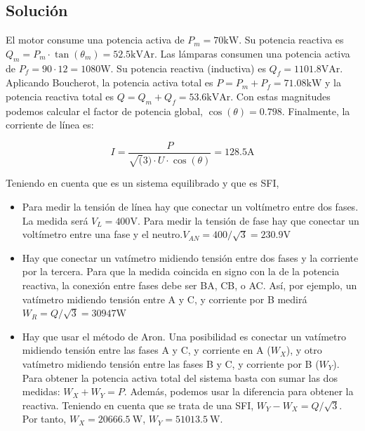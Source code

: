 \subsection*{Solución}

El motor consume una potencia activa de $P_m = 70\mathrm{kW}$. Su
potencia reactiva es
$Q_m = P_m \cdot \tan(\theta_m) = 52.5\mathrm{kVAr}$.  Las lámparas
consumen una potencia activa de $P_f = 90 \cdot 12 =
1080\mathrm{W}$. Su potencia reactiva (inductiva) es
$Q_f = 1101.8\mathrm{VAr}$.  Aplicando Boucherot, la potencia activa
total es $P = P_m + P_f = 71.08\mathrm{kW}$ y la potencia reactiva
total es $Q = Q_m + Q_f = 53.6\mathrm{kVAr}$. Con estas magnitudes
podemos calcular el factor de potencia global, $\cos(\theta) =
0.798$. Finalmente, la corriente de línea es:

\[
  I = \frac{P}{\sqrt(3) \cdot U \cdot \cos(\theta)} = 128.5\mathrm{A}
\]


Teniendo en cuenta que es un sistema equilibrado y que es SFI,

\begin{itemize}

\item Para medir la tensión de línea hay que conectar un voltímetro
  entre dos fases. La medida será $V_{L} = 400\mathrm{V}$. Para medir
  la tensión de fase hay que conectar un voltímetro entre una fase y
  el neutro.$V_{AN} = 400 / \sqrt{3} = 230.9\mathrm{V}$

\item Hay que conectar un vatímetro midiendo tensión entre dos fases y
  la corriente por la tercera. Para que la medida coincida en signo
  con la de la potencia reactiva, la conexión entre fases debe ser BA,
  CB, o AC. Así, por ejemplo, un vatímetro midiendo tensión entre A y
  C, y corriente por B medirá $W_R = Q / \sqrt{3} = 30947\mathrm{W}$

\item Hay que usar el método de Aron. Una posibilidad es conectar un
  vatímetro midiendo tensión entre las fases A y C, y corriente en A
  ($W_X$), y otro vatímetro midiendo tensión entre las fases B y C, y
  corriente por B ($W_Y$). Para obtener la potencia activa total del
  sistema basta con sumar las dos medidas: $W_{X} + W_{Y} =
  P$. Además, podemos usar la diferencia para obtener la
  reactiva. Teniendo en cuenta que se trata de una SFI,
  $W_Y - W_X = Q/\sqrt{3}$. Por tanto, $W_X = \SI{20666.5}{\watt}$,
  $W_Y = \SI{51013.5}{\watt}$.

\end{itemize}


